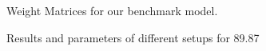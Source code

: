 \begin{figure}
    \caption{\label{fig:weight} Weight Matrices for our benchmark model.}
\end{figure}

\begin{figure}
    \caption{Results and parameters of different setups for 89.87}
    \label{fig:acc-iter}
\end{figure}

